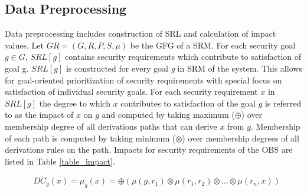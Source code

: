 \subsection{Data Preprocessing}
\label{pas_pre}


\setlength{\fboxsep}{6pt}%
\setlength{\fboxrule}{0.5pt}%


Data preprocessing includes construction of SRL and calculation of impact values. Let $GR = (G, R, P, S, \mu)$ be the GFG of a SRM. For each security goal $g \in G$, $SRL[g]$ contains security requirements which contribute to satisfaction of goal g. $SRL[g]$ is constructed for every goal \textit{g} in SRM of the system. This allows for goal-oriented prioritization of security requirements with special focus on satisfaction of individual security goals. For each security requirement $x$ in $SRL[g]$ the degree to which $x$ contributes to satisfaction of the goal $g$ is referred to as the impact of $x$ on $g$ and computed by taking maximum ($ \oplus $) over membership degree of all derivations paths that can derive $x$ from $g$. Membership of each path is computed by taking minimum ($ \otimes $) over membership degrees of all derivations rules on the path. Impacts for security requirements of the OBS are listed in Table \ref{table_impact}. 


\begin{align}
\label{Eq_imp}
& DC_{g} (x) = \mu_{g}(x)= \oplus(\mu(g,r_1)\otimes\mu(r_1,r_2)\otimes ... \otimes\mu(r_n,x))
\end{align}

